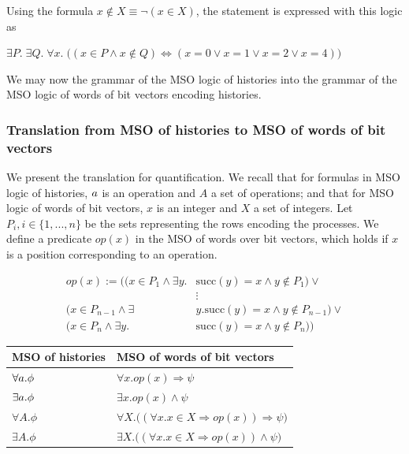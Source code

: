 \documentclass[12pt]{article}
\begin{document}
\vspace{1em}

Using the formula $x\notin X\equiv\neg(x\in X)$, the statement  is expressed with this logic as
\begin{center}
$
\exists P .\; \exists Q .\; \forall x .\; 
\Big( (x \in P \land x \notin Q) \Leftrightarrow (x = 0 \lor x = 1 \lor x = 2 \lor x = 4) \Big)
$
\end{center}

We may now  the grammar of the MSO logic of histories into the grammar of the MSO logic of words of bit vectors encoding histories.

\vspace{1em}


\subsubsection{Translation from MSO of histories to MSO of words of bit vectors}

We present the translation for quantification. We recall that for formulas in MSO logic of histories, $a$ is an operation and $A$ a set of operations; and that for MSO logic of words of bit vectors, $x$ is an integer and $X$ a set of integers. Let $P_i,i\in\{1,...,n\}$ be the sets representing the rows encoding the processes. We define a predicate $op(x)$ in the MSO of words over bit vectors, which holds if $x$ is a position corresponding to an operation.

\begin{align*}
op(x) := \Big(
	(x\in P_1 \land \exists y. &\text{succ}(y)=x \land y\notin P_1)\lor \\
 &\vdots \\
 (x\in P_{n-1} \land \exists &y. \text{succ}(y)=x \land y\notin P_{n-1})\lor \\
 (x\in P_n \land \exists y. &\text{succ}(y)=x \land y\notin P_n)\Big)
\end{align*}

\renewcommand{\arraystretch}{1.75}
\begin{table}[H]
\centering
\begin{tabular}{l|l}
MSO of histories & MSO of words of bit vectors \\
\hline
$\forall a.\phi$ & $\forall x.op(x)\Rightarrow \psi$ \\

\hline

$\exists a.\phi$ &  $\exists x.op(x)\land\psi$  \\

\hline

$\forall A.\phi$ & $\forall X.\big( (\forall x. x\in X\Rightarrow op(x) )\Rightarrow \psi \big)$ \\

\hline

$\exists A.\phi$ & $\exists X.\big( (\forall x. x\in X\Rightarrow op(x) )\land \psi \big)$ \\

\end{tabular}
\end{table}
\renewcommand{\arraystretch}{1}
\end{document}
